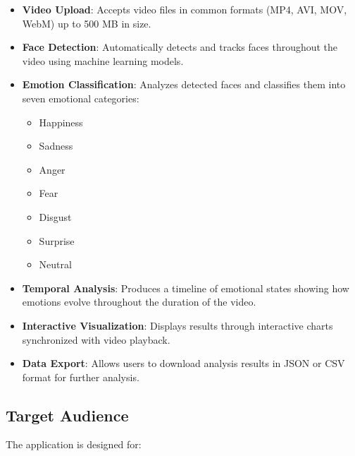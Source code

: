 \begin{itemize}
    \item \textbf{Video Upload}: Accepts video files in common formats (MP4, AVI, MOV, WebM) up to 500 MB in size.

    \item \textbf{Face Detection}: Automatically detects and tracks faces throughout the video using machine learning models.

    \item \textbf{Emotion Classification}: Analyzes detected faces and classifies them into seven emotional categories:
    \begin{itemize}
        \item Happiness
        \item Sadness
        \item Anger
        \item Fear
        \item Disgust
        \item Surprise
        \item Neutral
    \end{itemize}

    \item \textbf{Temporal Analysis}: Produces a timeline of emotional states showing how emotions evolve throughout the duration of the video.

    \item \textbf{Interactive Visualization}: Displays results through interactive charts synchronized with video playback.

    \item \textbf{Data Export}: Allows users to download analysis results in JSON or CSV format for further analysis.
\end{itemize}

\subsection{Target Audience}

The application is designed for:

